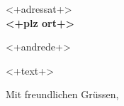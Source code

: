 \documentclass[12pt]{dinbrief}
\begin{document}
\begin{letter}{<+adressat+>\\[\medskipamount]
  \textbf{<+plz ort+>}}
  \subject{<+betreff+>}
  \date{<+datum+>}
  \nowindowrules
  \addresshigh
  \nowindowtics
  \opening{<+andrede+>}
  <+text+>
  \closing[Marius Kleiner]{Mit freundlichen Grüssen,}
\end{letter}
\end{document}
